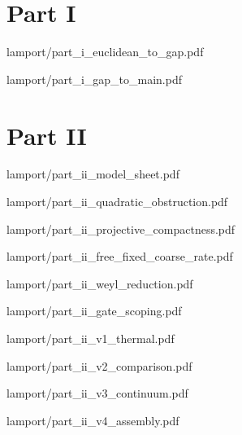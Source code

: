 \documentclass[11pt,a4paper]{article}
\begin{document}
\clearpage
\tableofcontents
\clearpage

\part*{Part I}


{lamport/part_i_euclidean_to_gap.pdf}


{lamport/part_i_gap_to_main.pdf}

\part*{Part II}


{lamport/part_ii_model_sheet.pdf}


{lamport/part_ii_quadratic_obstruction.pdf}


{lamport/part_ii_projective_compactness.pdf}


{lamport/part_ii_free_fixed_coarse_rate.pdf}


{lamport/part_ii_weyl_reduction.pdf}


{lamport/part_ii_gate_scoping.pdf}


{lamport/part_ii_v1_thermal.pdf}


{lamport/part_ii_v2_comparison.pdf}


{lamport/part_ii_v3_continuum.pdf}


{lamport/part_ii_v4_assembly.pdf}
\end{document}
